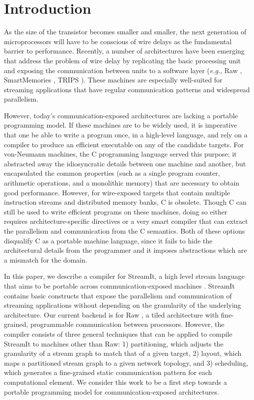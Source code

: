 \section{Introduction}

As the size of the transistor becomes smaller and smaller, the next
generation of microprocessors will have to be conscious of wire delays
as the fundamental barrier to performance.  Recently, a number of
architectures have been emerging that address the problem of wire
delay by replicating the basic processing unit and exposing the
communication between units to a software layer ({\it e.g.}, Raw
\cite{rawshort}, SmartMemories \cite{smartmemories}, TRIPS
\cite{trips}).  These machines are especially well-suited for
streaming applications that have regular communication patterns and
widespread parallelism.

However, today's communication-exposed architectures are lacking a
portable programming model.  If these machines are to be widely used,
it is imperative that one be able to write a program once, in a
high-level language, and rely on a compiler to produce an efficient
executable on any of the candidate targets. For von-Neumann machines,
the C programming language served this purpose; it abstracted away the
idiosyncratic details between one machine and another, but
encapsulated the common properties (such as a single program counter,
arithmetic operations, and a monolithic memory) that are necessary to
obtain good performance.  However, for wire-exposed targets that
contain multiple instruction streams and distributed memory banks, C
is obsolete.  Though C can still be used to write efficient programs
on these machines, doing so either requires architecture-specific
directives or a very smart compiler that can extract the parallelism
and communication from the C semantics.  Both of these options
disqualify C as a portable machine language, since it fails to hide
the architectural details from the programmer and it imposes
abstractions which are a mismatch for the domain.

In this paper, we describe a compiler for StreamIt, a high level
stream language that aims to be portable across communication-exposed
machines \cite{streamitcc}.  StreamIt contains basic constructs that
expose the parallelism and communication of streaming applications
without depending on the granularity of the underlying architecture.
Our current backend is for Raw \cite{rawshort}, a tiled architecture
with fine-grained, programmable communication between processors.
However, the compiler consists of three general techniques that can be
applied to compile StreamIt to machines other than Raw: 1)
partitioning, which adjusts the granularity of a stream graph to match
that of a given target, 2) layout, which maps a partitioned stream
graph to a given network topology, and 3) scheduling, which generates
a fine-grained static communication pattern for each computational
element.  We consider this work to be a first step towards a portable
programming model for communication-exposed architectures.

